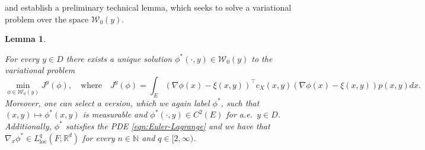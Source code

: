 \documentclass{article}
\theoremstyle{plain}
\newtheorem{lem}{Lemma}
\theoremstyle{definition}
\newcommand{\R}{\mathbb{R}}
\newcommand{\N}{\mathbb{N}}
\newcommand{\Wcal}{{\mathcal W}}
\numberwithin{lem}{section}
\begin{document}
and establish a preliminary technical lemma, which seeks to solve a variational problem over the space $\Wcal_0(y)$.
\begin{lem} \label{lem:variational_technical}

    For every $y \in D$ there exists a unique solution $\phi^*(\cdot,y) \in \Wcal_0(y)$ to the variational problem   \begin{equation} \label{eqn:variational_y}
     \min_{\phi \in \Wcal_0(y)} J^y(\phi), \quad \text{where} \quad  J^y(\phi) = \int_E (\nabla \phi(x) - \xi(x,y))^\top c_X(x,y)(\nabla \phi(x) - \xi(x,y))p(x,y)dx.
    \end{equation}
    Moreover, one can select a version, which we again label $\phi^*$, such that $(x,y) \mapsto \phi^*(x,y)$ is measurable and $\phi^*(\cdot,y) \in C^2(E)$ for a.e.\ $y\in D$. Additionally, $\phi^*$ satisfies the PDE \eqref{eqn:Euler-Lagrange} and we have that $\nabla_x \phi^* \in L^q_{\mathrm{loc}}(F;\R^d)$ for every $n \in \N$ and $q \in [2,\infty)$. 
\end{lem}

\end{document}
